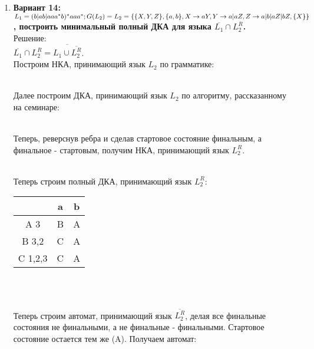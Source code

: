 \documentclass[10pt]{amsart}
\theoremstyle{plain}
\theoremstyle{remark}
\theoremstyle{definition}
\begin{document}
\begin{enumerate}
\item \textbf{Вариант 14: $L_1 = (b|ab|aaa^*b)^*aaa^*; G(L_2) = L_2 = \small\{\small\{X,Y,Z\small\}, \small\{a,b\small\}, X \rightarrow aY, Y\rightarrow a|aZ, Z\rightarrow a|b|aZ|bZ, \small\{X\small\}\small\}$, построить минимальный полный ДКА для языка $\overline{L_1} \cap L_2^{R}$.}\\
Решение:\\
$\overline{L_1} \cap L_2^{R} = \overline{L_1 \cup \overline{L_2^{R}}}$.\\
Построим НКА, принимающий язык $L_2$ по грамматике:\\
\begin{figure}[h]
\end{figure}\\\newpage
Далее построим ДКА, принимающий язык $L_2$ по алгоритму, рассказанному на семинаре:\\
\begin{figure}[h]
\end{figure}\\
Теперь, реверснув ребра и сделав стартовое состояние финальным, а финальное - стартовым, получим НКА, принимающий язык $L_2^{R}.$
\begin{figure}[h]
\end{figure}\\
Теперь строим полный ДКА, принимающий язык $L_2^{R}$:\\
\begin{tabular}{|c|c|c|}
    \hline
     & a & b  \\
   \hline
    A 3 & B & A \\
   \hline
  B 3,2 & C & A\\
   \hline
   C 1,2,3 & C & A\\
    \hline\end{tabular}\\
    \newpage
\begin{figure}[h]
\end{figure}\\
Теперь строим автомат, принимающий язык $\overline{L_2^{R}}$, делая все финальные состояния не финальными, а не финальные - финальными. Стартовое состояние остается тем же (A). Получаем автомат:\\
\begin{figure}[h]
\end{figure}\\\newpage

\end{enumerate}
\end{document}

